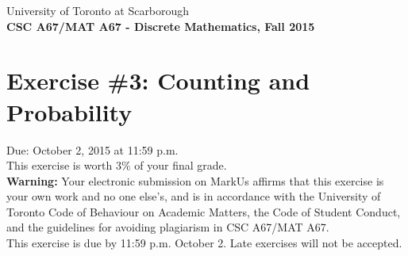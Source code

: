 \documentclass{article}
\begin{document}
{\large \noindent{}University of Toronto at Scarborough\\
\textbf{CSC A67/MAT A67 - Discrete Mathematics, Fall 2015}}

\section*{\huge Exercise \#3: Counting and Probability}

{\large Due: October 2, 2015 at 11:59 p.m.\\
This exercise is worth 3\% of your final grade.}\\[1em]
\textbf{Warning:} Your electronic submission on MarkUs affirms that this exercise is your own work and no
one else's, and is in accordance with the University of Toronto Code of Behaviour on Academic Matters,
the Code of Student Conduct, and the guidelines for avoiding plagiarism in CSC A67/MAT A67.\\[1ex]
This exercise is due by 11:59 p.m. October 2. Late exercises will not be accepted.\\[1ex]
\renewcommand{\labelenumi}{\arabic{enumi}.}
\renewcommand{\labelenumii}{(\alph{enumii})}
\end{document}
